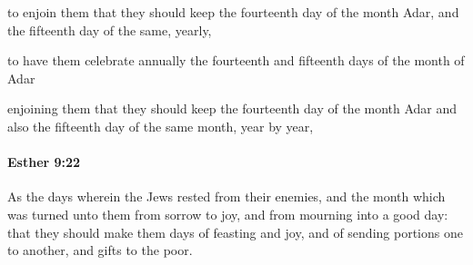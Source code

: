 			\begin{versebox}
					\item[BHS] 
					\item[LXX] 
					\item[ASV] to enjoin them that they should keep the fourteenth day of the month Adar, and the fifteenth day of the same, yearly,
					\item[NIV] to have them celebrate annually the fourteenth and fifteenth days of the month of Adar
					\item[NRSV] enjoining them that they should keep the fourteenth day of the month Adar and also the fifteenth day of the same month, year by year,
			\end{versebox}

		\paragraph{Esther 9:22} %
			\label{ESTHER-9-22}

			As the days wherein the Jews rested from their enemies, and the month which was turned unto them from sorrow to joy, and from mourning into a good day: that they should make them days of feasting and joy, and of sending portions one to another, and gifts to the poor.

